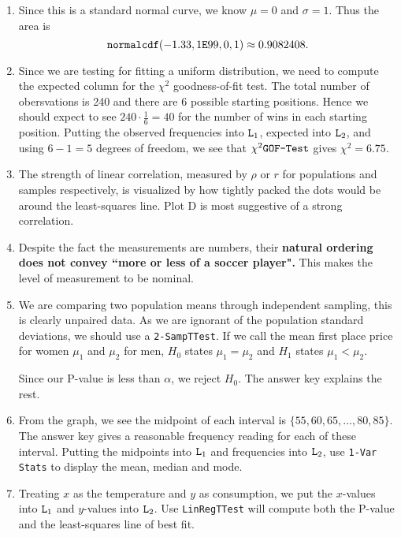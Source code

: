 \documentclass{article}
\newcommand{\calcfunc}[1]{\mbox{\texttt{#1}}}
\begin{document}
\begin{enumerate}
\item {} Since this is a standard normal curve, we know $\mu=0$ and $\sigma =1$. Thus the area is 
$$\calcfunc{normalcdf}(-1.33, 1\calcfunc{E}99, 0, 1) \approx 0.9082408.$$

\item {} Since we are testing for fitting a uniform distribution, we need to compute the expected column for the $\chi^2$ goodness-of-fit test. The total number of obersvations is 240 and there are 6 possible starting positions. Hence we should expect to see $240\cdot\frac{1}{6}=40$ for the number of wins in each starting position. Putting the observed frequencies into $\calcfunc{L}_1$, expected into $\calcfunc{L}_2$, and using $6-1=5$ degrees of freedom, we see that $\chi^2\calcfunc{GOF-Test}$ gives $\chi^2=6.75$.

\item {} The strength of linear correlation, measured by $\rho$ or $r$ for populations and samples respectively, is visualized by how tightly packed the dots would be around the least-squares line. Plot D is most suggestive of a strong correlation.

\item {} Despite the fact the measurements are numbers, their \textbf{natural ordering does not convey ``more or less of a soccer player".} This makes the level of measurement to be nominal.

\item We are comparing two population means through independent sampling, this is clearly unpaired data. As we are ignorant of the population standard deviations, we should use a \texttt{2-SampTTest}. If we call the mean first place price for women $\mu_1$ and $\mu_2$ for men, $H_0$ states $\mu_1=\mu_2$ and $H_1$ states $\mu_1 < \mu_2$. 

Since our P-value is less than $\alpha$, we reject $H_0$. The answer key explains the rest.

\item From the graph, we see the midpoint of each interval is $\{55,60,65,\ldots, 80, 85\}$. The answer key gives a reasonable frequency reading for each of these interval. Putting the midpoints into $\calcfunc{L}_1$ and frequencies into $\calcfunc{L}_2$, use \texttt{1-Var Stats} to display the mean, median and mode.

\item Treating $x$ as the temperature and $y$ as consumption, we put the $x$-values into $\calcfunc{L}_1$ and $y$-values into $\calcfunc{L}_2$. Use \texttt{LinRegTTest} will compute both the P-value and the least-squares line of best fit.


\end{enumerate}
\end{document}
